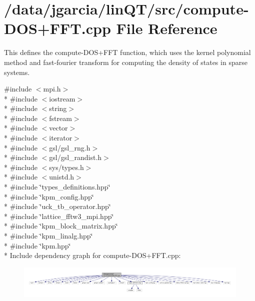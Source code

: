 \hypertarget{compute-DOS_09FFT_8cpp}{}\section{/data/jgarcia/lin\+Q\+T/src/compute-\/\+D\+O\+S+\+F\+FT.cpp File Reference}
\label{compute-DOS_09FFT_8cpp}


This defines the compute-\/\+D\+O\+S+\+F\+FT function, which uses the kernel polynomial method and fast-\/fourier transform for computing the density of states in sparse systems.  


{\ttfamily \#include $<$mpi.\+h$>$}\\*
{\ttfamily \#include $<$iostream$>$}\\*
{\ttfamily \#include $<$string$>$}\\*
{\ttfamily \#include $<$fstream$>$}\\*
{\ttfamily \#include $<$vector$>$}\\*
{\ttfamily \#include $<$iterator$>$}\\*
{\ttfamily \#include $<$gsl/gsl\+\_\+rng.\+h$>$}\\*
{\ttfamily \#include $<$gsl/gsl\+\_\+randist.\+h$>$}\\*
{\ttfamily \#include $<$sys/types.\+h$>$}\\*
{\ttfamily \#include $<$unistd.\+h$>$}\\*
{\ttfamily \#include \char`\"{}types\+\_\+definitions.\+hpp\char`\"{}}\\*
{\ttfamily \#include \char`\"{}kpm\+\_\+config.\+hpp\char`\"{}}\\*
{\ttfamily \#include \char`\"{}uck\+\_\+tb\+\_\+operator.\+hpp\char`\"{}}\\*
{\ttfamily \#include \char`\"{}lattice\+\_\+fftw3\+\_\+mpi.\+hpp\char`\"{}}\\*
{\ttfamily \#include \char`\"{}kpm\+\_\+block\+\_\+matrix.\+hpp\char`\"{}}\\*
{\ttfamily \#include \char`\"{}kpm\+\_\+linalg.\+hpp\char`\"{}}\\*
{\ttfamily \#include \char`\"{}kpm.\+hpp\char`\"{}}\\*
Include dependency graph for compute-\/\+D\+O\+S+\+F\+FT.cpp\+:
\nopagebreak
\begin{figure}[H]
\begin{center}
\leavevmode
\includegraphics[width=350pt]{compute-DOS_09FFT_8cpp__incl}
\end{center}
\end{figure}

